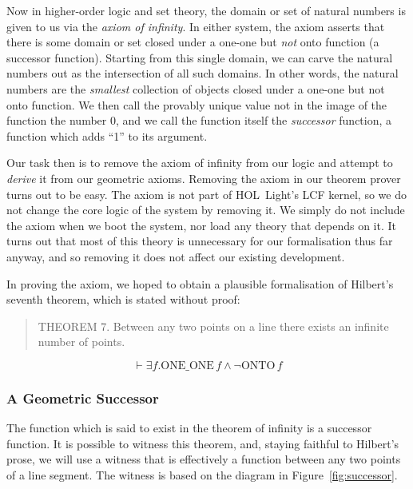 \documentclass{article}
\begin{document}
Now in higher-order logic and set theory, the domain or set of natural numbers is given to us via the \emph{axiom of infinity}. In either system, the axiom asserts that there is some domain or set closed under a one-one but \emph{not} onto function (a successor function). Starting from this single domain, we can carve the natural numbers out as the intersection of all such domains. In other words, the natural numbers are the \emph{smallest} collection of objects closed under a one-one but not onto function. We then call the provably unique value not in the image of the function the number $0$, and we call the function itself the \emph{successor} function, a function which adds ``1'' to its argument.

Our task then is to remove the axiom of infinity from our logic and attempt to \emph{derive} it from our geometric axioms. Removing the axiom in our theorem prover turns out to be easy. The axiom is not part of HOL~Light's LCF kernel, so we do not change the core logic of the system by removing it. We simply do not include the axiom when we boot the system, nor load any theory that depends on it. It turns out that most of this theory is unnecessary for our formalisation thus far anyway, and so removing it does not affect our existing development.

In proving the axiom, we hoped to obtain a plausible formalisation of Hilbert's seventh theorem, which is stated without proof:

\begin{quote}\label{theorem:Theorem7}
THEOREM 7. Between any two points on a line there exists an infinite number of points.
\end{quote}

\begin{displaymath}
\vdash \exists f. \text{ONE\_ONE}\,f \wedge \neg\text{ONTO}\,f
\end{displaymath}

\subsubsection{A Geometric Successor}
The function which is said to exist in the theorem of infinity is a successor function. It is possible to  witness this theorem, and, staying faithful to Hilbert's prose, we will use a witness that is effectively a function between any two points of a line segment. The witness is based on the diagram in Figure~\ref{fig:successor}.
\end{document}
